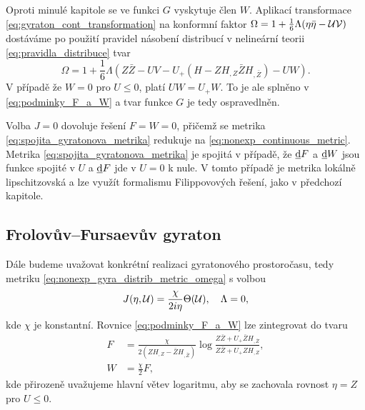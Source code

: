 Oproti minulé kapitole se ve funkci $G$ vyskytuje člen $W$. Aplikací transformace \eqref{eq:gyraton_cont_transformation}
na konformní faktor $\Omega = 1 + \frac{1}{6} \Lambda (\eta \bar{\eta} - \mathcal{U} \mathcal{V})$ dostáváme po použití pravidel násobení distribucí v nelineární teorii \eqref{eq:pravidla_distribuce} tvar
\begin{equation}
    \Omega = 1 + \frac{1}{6} \Lambda \left(Z \bar{Z} - UV - U_+ (H - Z H_{,Z} \bar{Z} H_{,\bar{Z}}) - UW \right).
\end{equation}
V případě že $W = 0$ pro $U \leq 0$, platí $UW = U_+ W$. To je ale splněno v \eqref{eq:podminky_F_a_W} a tvar funkce $G$ je tedy ospravedlněn.

Volba $J=0$ dovoluje řešení $F = W = 0$, přičemž se metrika \eqref{eq:spojita_gyratonova_metrika} redukuje na \eqref{eq:nonexp_continuous_metric}.
Metrika \eqref{eq:spojita_gyratonova_metrika} je spojitá v případě, že $\underline{\mathrm{d}}F$ a $\underline{\mathrm{d}}W$ jsou funkce spojité v $U$ a $\underline{\mathrm{d}}F$
jde v $U=0$ k nule. V tomto případě je metrika lokálně lipschitzovská a lze využít formalismu Filippovových řešení, jako v předchozí kapitole.


\subsection{Frolovův--Fursaevův gyraton}
Dále budeme uvažovat konkrétní realizaci gyratonového prostoročasu, tedy metriku \eqref{eq:nonexp_gyra_distrib_metric_omega} s volbou
\begin{equation}
    J(\eta , \mathcal{U}) = \frac{\chi}{2 i \eta} \Theta( \mathcal{U} ),~~~ \Lambda = 0,
\end{equation}
kde $\chi$ je konstantní. Rovnice \eqref{eq:podminky_F_a_W} lze zintegrovat do tvaru
\begin{equation}
    \label{eq:zintegrovane1}
    \begin{split}
        F &= \frac{\chi}{2(Z H_{,Z}-\bar{Z}H_{,\bar{Z}})} \log \frac{Z\bar{Z}+U_{+}\bar{Z}H_{,\bar{Z}}}{Z\bar{Z}+U_{+}ZH_{,Z}}, \\
        W &= \frac{\chi}{2}F,
    \end{split}
\end{equation}
kde přirozeně uvažujeme hlavní větev logaritmu, aby se zachovala rovnost $\eta = Z$ pro $U \leq 0$.

